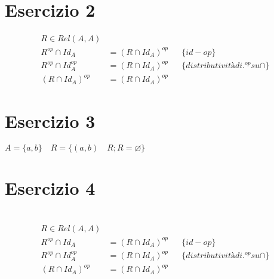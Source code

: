 \documentclass{article}
\begin{document}
\section{Esercizio 2}
\begin{align*}
    R \in Rel(A,A) \\
    R^{op} \cap Id_A &= (R \cap Id_A)^{op} && \{id-op\} \\
    R^{op} \cap Id_A^{op} &= (R \cap Id_A)^{op} && \{distributività di .^{op} su \cap\} \\
    (R \cap Id_A)^{op} &= (R \cap Id_A)^{op}
\end{align*}

\section{Esercizio 3}
\(A = \{a,b\} \quad R = \{(a,b) \quad R;R = \varnothing\}\)

\section{Esercizio 4}
\
\begin{align*}
    R \in Rel(A,A) \\
    R^{op} \cap Id_A &= (R \cap Id_A)^{op} && \{id-op\} \\
    R^{op} \cap Id_A^{op} &= (R \cap Id_A)^{op} && \{distributività di .^{op} su \cap\} \\
    (R \cap Id_A)^{op} &= (R \cap Id_A)^{op}
\end{align*}
\end{document}
